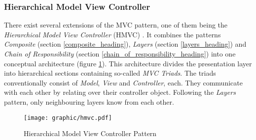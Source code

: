 %
%
%
%
%
%
%

\subsubsection{Hierarchical Model View Controller}
\label{hierarchical_model_view_controller_heading}

There exist several extensions of the MVC pattern, one of them being the
\emph{Hierarchical Model View Controller} (HMVC) \cite{cai}. It combines the
patterns \emph{Composite} (section \ref{composite_heading}), \emph{Layers}
(section \ref{layers_heading}) and \emph{Chain of Responsibility} (section
\ref{chain_of_responsibility_heading}) into one conceptual architecture (figure
\ref{hmvc_figure}). This architecture divides the presentation layer into
hierarchical sections containing so-called \emph{MVC Triads}. The triads
conventionally consist of \emph{Model}, \emph{View} and \emph{Controller},
each. They communicate with each other by relating over their controller
object. Following the \emph{Layers} pattern, only neighbouring layers know from
each other.

\begin{figure}[ht]
    \begin{center}
        \texttt{[image: graphic/hmvc.pdf]}
        \caption{Hierarchical Model View Controller Pattern}
        \label{hmvc_figure}
    \end{center}
\end{figure}

